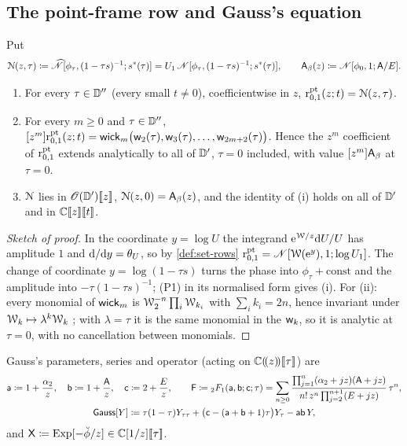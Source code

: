 \subsection{The point-frame row and Gauss's equation}
\label{sec:row-wickrow}

Put
\[
\mathcal{N}(z,\tau)\coloneqq\widehat{\mathscr{N}}[\phi_\tau,(1-\tau s)^{-1};s^{\ast}(\tau)]=U_1\,\mathscr{N}[\phi_\tau,(1-\tau s)^{-1};s^{\ast}(\tau)],\qquad \mathsf{A}_{\beta}(z)\coloneqq\mathscr{N}[\phi_0,1;\mathsf{A}/E].
\]

\begin{prop}
\label{prop:row-wickrow}
\begin{enumerate}
\item For every $\tau\in\mathbb{D}''$ (every small $t\neq0$), coefficientwise in $z$, $\mathrm{r}^{\mathrm{pt}}_{0,1}(z;t)=\mathcal{N}(z,\tau)$.
\item For every $m\geq0$ and $\tau\in\mathbb{D}''$, $[z^m]\mathrm{r}^{\mathrm{pt}}_{0,1}(z;t)=\mathsf{wick}_m\big(\mathsf{w}_2(\tau),\mathsf{w}_3(\tau),\dots,\mathsf{w}_{2m+2}(\tau)\big)$. Hence the $z^m$ coefficient of $\mathrm{r}^{\mathrm{pt}}_{0,1}$ extends analytically to all of $\mathbb{D}'$, $\tau=0$ included, with value $[z^m]\mathsf{A}_{\beta}$ at $\tau=0$.
\item $\mathcal{N}$ lies in $\mathscr{O}(\mathbb{D}')[\![ z ]\!]$, $\mathcal{N}(z,0)=\mathsf{A}_{\beta}(z)$, and the identity of (i) holds on all of $\mathbb{D}'$ and in $\mathbb{C}[\![ z ]\!][\![ t ]\!]$.
\end{enumerate}
\end{prop}

\begin{proof}[Sketch of proof]
In the coordinate $y=\log U$ the integrand $\mathrm{e}^{\mathcal{W}/z}\mathrm{d} U/U$ has amplitude $1$ and $\mathrm{d}/\mathrm{d} y=\theta_{U}$, so by \cref{def:set-rows} $\mathrm{r}^{\mathrm{pt}}_{0,1}=\mathscr{N}[\mathcal{W}(\mathrm{e}^y),1;\log U_1]$. The change of coordinate $y=\log(1-\tau s)$ turns the phase into $\phi_\tau+\mathrm{const}$ and the amplitude into $-\tau(1-\tau s)^{-1}$; (P1) in its normalised form gives (i). For (ii): every monomial of $\mathsf{wick}_m$ is $\mathcal{W}_2^{-n}\prod_i\mathcal{W}_{k_i}$ with $\sum_ik_i=2n$, hence invariant under $\mathcal{W}_k\mapsto\lambda^k\mathcal{W}_k$ ; with $\lambda=\tau$ it is the same monomial in the $\mathsf{w}_k$, so it is analytic at $\tau=0$, with no cancellation between monomials.
\end{proof}

Gauss's parameters, series and operator (acting on $\mathbb{C}(\!(z)\!)[\![ \tau ]\!]$) are
\begin{equation}
\label{eq:row-gaussdef}
\begin{gathered}
\mathsf{a}\coloneqq1+\frac{\alpha_2}{z},\quad \mathsf{b}\coloneqq1+\frac{\mathsf{A}}{z},\quad \mathsf{c}\coloneqq2+\frac Ez,\qquad
\mathsf{F}\coloneqq{}_2F_1(\mathsf{a},\mathsf{b};\mathsf{c};\tau)=\sum_{n\geq0}\frac{\prod_{j=1}^{n}(\alpha_2+jz)(\mathsf{A}+jz)}{n!\,z^n\prod_{j=2}^{n+1}(E+jz)}\,\tau^n,\\
\mathsf{Gauss}[Y]\coloneqq\tau(1-\tau)Y_{\tau\tau}+\big(\mathsf{c}-(\mathsf{a}+\mathsf{b}+1)\tau\big)Y_\tau-\mathsf{a}\mathsf{b}\,Y ,
\end{gathered}
\end{equation}
and $\mathsf{X}\coloneqq\mathrm{Exp}[-\breve{\phi}/z]\in\mathbb{C}[1/z][\![ \tau ]\!]$.


